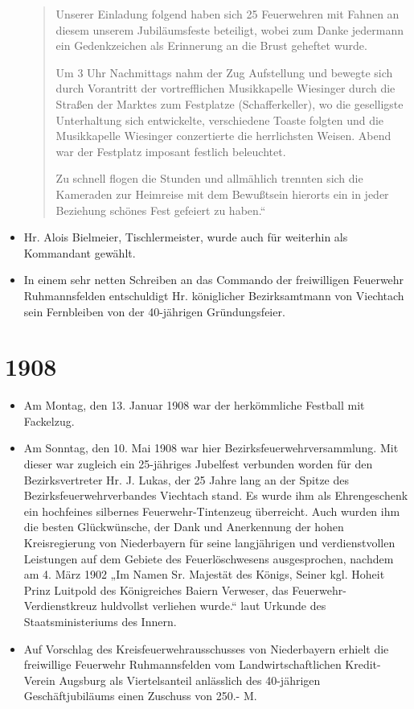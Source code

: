 \documentclass[12pt,a4paper]{book}
\begin{document}
\begin{itemize}
\begin{quote}
Unserer Einladung folgend haben sich 25 Feuerwehren mit Fahnen an diesem
unserem Jubiläumsfeste beteiligt, wobei zum Danke jedermann ein
Gedenkzeichen als Erinnerung an die Brust geheftet wurde.

Um 3 Uhr Nachmittags nahm der Zug Aufstellung und bewegte sich durch
Vorantritt der vortrefflichen Musikkapelle Wiesinger durch die Straßen
der Marktes zum Festplatze (Schafferkeller), wo die geselligste
Unterhaltung sich entwickelte, verschiedene Toaste folgten und die
Musikkapelle Wiesinger conzertierte die herrlichsten Weisen. Abend war
der Festplatz imposant festlich beleuchtet.

Zu schnell flogen die Stunden und allmählich trennten sich die Kameraden
zur Heimreise mit dem Bewußtsein hierorts ein in jeder Beziehung schönes
Fest gefeiert zu haben.“
\end{quote}

\item Hr. Alois Bielmeier, Tischlermeister, wurde auch für weiterhin als
Kommandant gewählt.

\item In einem sehr netten Schreiben an das Commando der freiwilligen
Feuerwehr Ruhmannsfelden entschuldigt Hr. königlicher Bezirksamtmann von
Viechtach sein Fernbleiben von der 40-jährigen Gründungsfeier.
\end{itemize}

\section*{1908}

\begin{itemize}
\item Am Montag, den 13. Januar 1908 war der herkömmliche Festball mit
Fackelzug.

\item Am Sonntag, den 10. Mai 1908 war hier Bezirksfeuerwehrversammlung.
Mit dieser war zugleich ein 25-jähriges Jubelfest verbunden worden für
den Bezirksvertreter Hr. J. Lukas, der 25 Jahre lang an der Spitze des
Bezirksfeuerwehrverbandes Viechtach stand. Es wurde ihm als
Ehrengeschenk ein hochfeines silbernes Feuerwehr-Tintenzeug überreicht.
Auch wurden ihm die besten Glückwünsche, der Dank und Anerkennung der
hohen Kreisregierung von Niederbayern für seine langjährigen und
verdienstvollen Leistungen auf dem Gebiete des Feuerlöschwesens
ausgesprochen, nachdem am 4. März 1902 „Im Namen Sr. Majestät des
Königs, Seiner kgl. Hoheit Prinz Luitpold des Königreiches Baiern
Verweser, das Feuerwehr-Verdienstkreuz huldvollst verliehen wurde.“ laut
Urkunde des Staatsministeriums des Innern.

\item Auf Vorschlag des Kreisfeuerwehrausschusses von Niederbayern
erhielt die freiwillige Feuerwehr Ruhmannsfelden vom
Landwirtschaftlichen Kredit-Verein Augsburg als Viertelsanteil
anlässlich des 40-jährigen Geschäftjubiläums einen Zuschuss von 250.- M.
\end{itemize}
\end{document}
